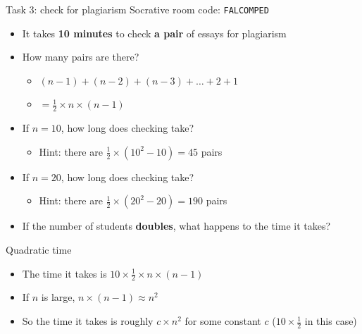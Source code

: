 \begin{frame}{Task 3: check for plagiarism}
	Socrative room code: \texttt{FALCOMPED}
	\begin{itemize}
		\item It takes \textbf{10 minutes} to check \textbf{a pair} of essays for plagiarism \pause
		\item How many pairs are there? \pause
		\begin{itemize}
			\item $(n-1) + (n-2) + (n-3) + \dots + 2 + 1$ \pause
			\item $= \frac12 \times n \times (n-1)$ \pause
		\end{itemize}
		\item If $n=10$, how long does checking take?
		\begin{itemize}
			\item Hint: there are $\frac12 \times \left( 10^2 - 10 \right) = 45$ pairs \pause
		\end{itemize}
		\item If $n=20$, how long does checking take?
		\begin{itemize}
			\item Hint: there are $\frac12 \times \left( 20^2 - 20 \right) = 190$ pairs \pause
		\end{itemize}
		\item If the number of students \textbf{doubles}, what happens to the time it takes?
	\end{itemize}
\end{frame}

\begin{frame}{Quadratic time}
	\begin{itemize}
		\item The time it takes is $10 \times \frac12 \times n \times (n-1)$ \pause
		\item If $n$ is large, $n \times (n-1) \approx n^2$ \pause
		\item So the time it takes is roughly $c \times n^2$ for some constant $c$ ($10 \times \frac12$ in this case)
	\end{itemize}
\end{frame}

